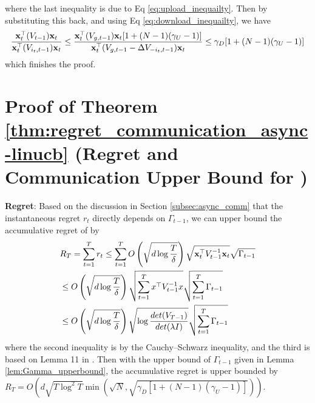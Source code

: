 where the last inequality is due to Eq \eqref{eq:upload_inequailty}.
Then by substituting this back, and using Eq \eqref{eq:download_inequailty}, we have
\begin{align*}
    \frac{\mathbf{x}_{t}^{\top}(V_{t-1})\mathbf{x}_{t}}{\mathbf{x}_{t}^{\top}(V_{i_{t},t-1})\mathbf{x}_{t}} \leq \frac{\mathbf{x}_{t}^{\top}({V}_{g,t-1})\mathbf{x}_{t} [1+(N-1)(\gamma_{U}-1)] }{\mathbf{x}_{t}^{\top}(V_{g,t-1}-\Delta{V}_{-i_{t},t-1})\mathbf{x}_{t}} \leq \gamma_{D} [1+(N-1)(\gamma_{U}-1)]
\end{align*}
which finishes the proof.

\section{Proof of Theorem \ref{thm:regret_communication_async-linucb} (Regret and Communication Upper Bound for \modelone{})}
\noindent \textbf{Regret}:
Based on the discussion in Section \ref{subsec:async_comm} that the instantaneous regret $r_{t}$ directly depends on $\Gamma_{t-1}$, we can upper bound the accumulative regret of \modelone{} by 
\begin{align*}
& R_{T} = \sum_{t=1}^{T}r_{t} \leq \sum_{t=1}^{T}O\left(\sqrt{d\log{\frac{T}{\delta}}}\right)\sqrt{\mathbf{x}_{t}^{\top}{V}_{t-1}^{-1}\mathbf{x}_{t}}\sqrt{\Gamma_{t-1}} \\
& \leq O\left(\sqrt{d\log{\frac{T}{\delta}}}\right)\sqrt{\sum_{t=1}^{T}x^{\top}{V}_{t-1}^{-1}x} \sqrt{\sum_{t=1}^{T}\Gamma_{t-1}} \\
& \leq O\left(\sqrt{d\log{\frac{T}{\delta}}}\right)  \sqrt{\log{\frac{det({V}_{T-1})}{det(\lambda I)}}}\sqrt{\sum_{t=1}^{T}\Gamma_{t-1}}
\end{align*}
where the second inequality is by the Cauchy–Schwarz inequality, and the third is based on Lemma 11 in \cite{abbasi2011improved}.
Then with the upper bound of $\Gamma_{t-1}$ given in Lemma \ref{lem:Gamma_upperbound}, the accumulative regret is upper bounded by $R_{T} = O\left(d\sqrt{T\log^{2}{T}}\min(\sqrt{N},\sqrt{\gamma_{D} [1+(N-1)(\gamma_{U}-1)]})\right)$. 

